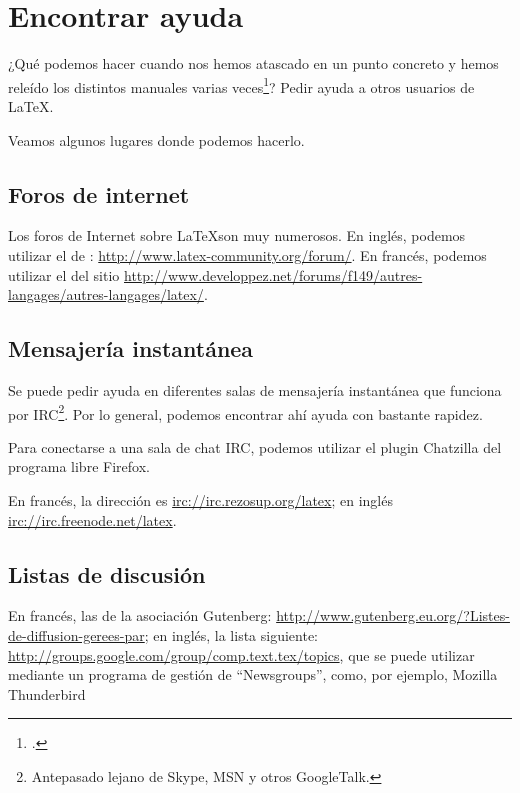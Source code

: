 \chapter{Encontrar ayuda}

\begin{intro}
¿Qué podemos hacer cuando nos hemos atascado en un punto concreto y hemos releído los distintos manuales varias veces\footcite[Señalemos, de paso, la posibilidad de descargar una ayuda sobre el conjunto de los errores de compilación con \LaTeX{}:][]{erreurscompilo}? Pedir ayuda a otros usuarios de \LaTeX{}.

Veamos algunos lugares donde podemos hacerlo.
\end{intro}


\section{Foros de internet}

Los foros de Internet sobre \LaTeX son muy numerosos. En inglés, podemos utilizar el de : \url{http://www.latex-community.org/forum/}. En francés, podemos utilizar el del sitio  \url{http://www.developpez.net/forums/f149/autres-langages/autres-langages/latex/}.


\section{Mensajería instantánea}

Se puede pedir ayuda en diferentes salas de mensajería instantánea que funciona por IRC\footnote{Antepasado lejano de Skype, MSN y otros GoogleTalk.}. Por lo general, podemos encontrar ahí ayuda con bastante rapidez.

Para conectarse a una sala de chat IRC, podemos utilizar el plugin Chatzilla del programa libre Firefox.

En francés, la dirección es \url{irc://irc.rezosup.org/latex}; en inglés
\url{irc://irc.freenode.net/latex}.


\section{Listas de discusión}

En francés, las de la asociación Gutenberg: \url{http://www.gutenberg.eu.org/?Listes-de-diffusion-gerees-par}; en inglés, la lista siguiente: \url{http://groups.google.com/group/comp.text.tex/topics}, que se puede utilizar mediante un programa de gestión de \enquote{Newsgroups}, como, por ejemplo, Mozilla Thunderbird
